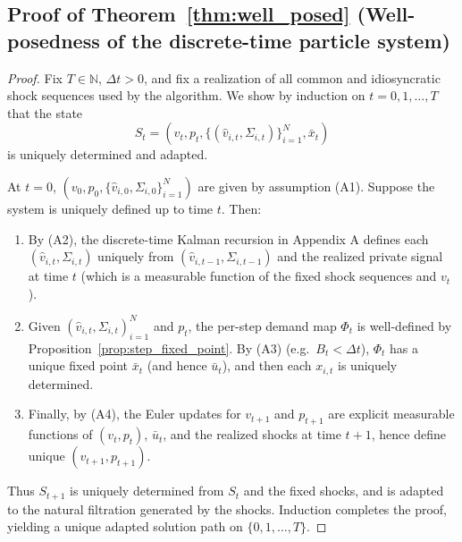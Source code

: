 \subsection*{Proof of Theorem~\ref{thm:well_posed} (Well-posedness of the discrete-time particle system)}
\begin{proof}
Fix $T\in\mathbb N$, $\Delta t>0$, and fix a realization of all common and idiosyncratic shock sequences used by the algorithm.
We show by induction on $t=0,1,\dots,T$ that the state
\[
S_t=(v_t,p_t,\{(\hat v_{i,t},\Sigma_{i,t})\}_{i=1}^N,\bar x_t)
\]
is uniquely determined and adapted.

At $t=0$, $(v_0,p_0,\{\hat v_{i,0},\Sigma_{i,0}\}_{i=1}^N)$ are given by assumption (A1). Suppose the system is uniquely
defined up to time $t$. Then:
\begin{enumerate}[leftmargin=2em]
\item By (A2), the discrete-time Kalman recursion in Appendix A defines each $(\hat v_{i,t},\Sigma_{i,t})$ uniquely from
$(\hat v_{i,t-1},\Sigma_{i,t-1})$ and the realized private signal at time $t$ (which is a measurable function of the fixed
shock sequences and $v_t$).
\item Given $(\hat v_{i,t},\Sigma_{i,t})_{i=1}^N$ and $p_t$, the per-step demand map $\Phi_t$ is well-defined by Proposition~\ref{prop:step_fixed_point}.
By (A3) (e.g.\ $B_t<\Delta t$), $\Phi_t$ has a unique fixed point $\bar x_t$ (and hence $\bar u_t$), and then each $x_{i,t}$ is uniquely determined.
\item Finally, by (A4), the Euler updates for $v_{t+1}$ and $p_{t+1}$ are explicit measurable functions of $(v_t,p_t)$, $\bar u_t$,
and the realized shocks at time $t+1$, hence define unique $(v_{t+1},p_{t+1})$.
\end{enumerate}
Thus $S_{t+1}$ is uniquely determined from $S_t$ and the fixed shocks, and is adapted to the natural filtration generated by
the shocks. Induction completes the proof, yielding a unique adapted solution path on $\{0,1,\dots,T\}$.
\end{proof}

